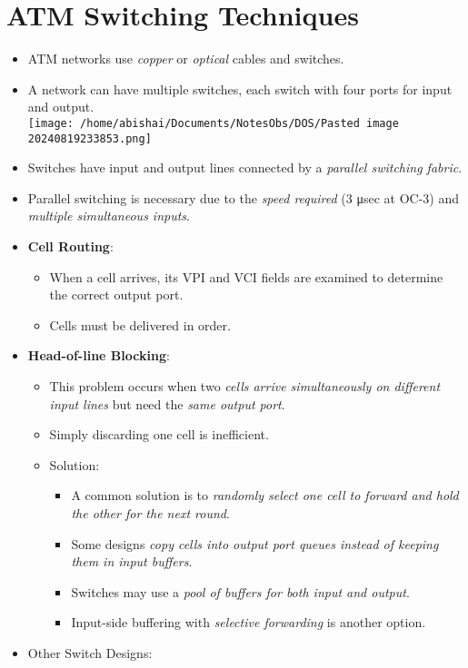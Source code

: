 \documentclass[
]{article}
\providecommand{\tightlist}{%
  \setlength{\itemsep}{0pt}\setlength{\parskip}{0pt}}
\begin{document}
\hypertarget{atm-switching-techniques}{%
\section{ATM Switching Techniques}\label{atm-switching-techniques}}

\begin{itemize}
\tightlist
\item
  ATM networks use \emph{copper} or \emph{optical} cables and switches.
\item
  A network can have multiple switches, each switch with four ports for
  input and output.\\
  \texttt{[image: /home/abishai/Documents/NotesObs/DOS/Pasted image 20240819233853.png]}
\item
  Switches have input and output lines connected by a \emph{parallel
  switching fabric}.
\item
  Parallel switching is necessary due to the \emph{speed required} (3
  μsec at OC-3) and \emph{multiple simultaneous inputs}.
\item
  \textbf{Cell Routing}:

  \begin{itemize}
  \tightlist
  \item
    When a cell arrives, its VPI and VCI fields are examined to
    determine the correct output port.
  \item
    Cells must be delivered in order.
  \end{itemize}
\item
  \textbf{Head-of-line Blocking}:

  \begin{itemize}
  \tightlist
  \item
    This problem occurs when two \emph{cells arrive simultaneously on
    different input lines} but need the \emph{same output port}.
  \item
    Simply discarding one cell is inefficient.
  \item
    Solution:

    \begin{itemize}
    \tightlist
    \item
      A common solution is to \emph{randomly select one cell to forward
      and hold the other for the next round}.
    \item
      Some designs \emph{copy cells into output port queues instead of
      keeping them in input buffers}.
    \item
      Switches may use a \emph{pool of buffers for both input and
      output}.
    \item
      Input-side buffering with \emph{selective forwarding} is another
      option.
    \end{itemize}
  \end{itemize}
\item
  Other Switch Designs:


\end{itemize}
\end{document}
